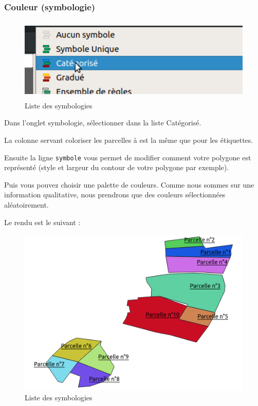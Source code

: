 \hypertarget{couleur-symbologie}{%
\subsubsection{Couleur (symbologie)}\label{couleur-symbologie}}

\begin{figure}
\centering
\includegraphics[width=\textwidth,height=1.5625in]{figures/symbologie.png}
\caption{Liste des symbologies}
\end{figure}

Dans l'onglet symbologie, sélectionner dans la liste Catégorisé.

La colonne servant coloriser les parcelles à est la même que pour les
étiquettes.

Ensuite la ligne \texttt{symbole} vous permet de modifier comment votre
polygone est représenté (style et largeur du contour de votre polygone
par exemple).

Puis vous pouvez choisir une palette de couleurs. Comme nous sommes sur
une information qualitative, nous prendrons que des couleurs
sélectionnées aléatoirement.

Le rendu est le suivant :

\begin{figure}
\centering
\includegraphics{figures/parcelles_categorise.png}
\caption{Liste des symbologies}
\end{figure}

